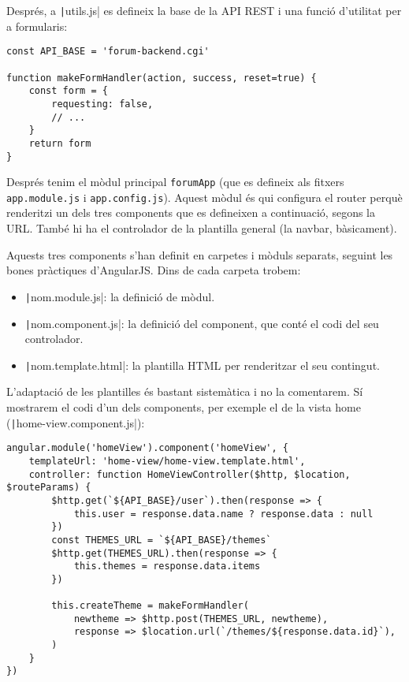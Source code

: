 \documentclass[catalan, a4paper]{scrartcl}
\begin{document}
Després, a \texttt|utils.js| es defineix la base de la API
REST i una funció d'utilitat per a formularis:

\begin{verbatim}
const API_BASE = 'forum-backend.cgi'

function makeFormHandler(action, success, reset=true) {
    const form = {
        requesting: false,
        // ...
    }
    return form
}
\end{verbatim}

Després tenim el mòdul principal \texttt{forumApp} (que es
defineix als fitxers \texttt{app.module.js} i \texttt{app.config.js}).
Aquest mòdul és qui configura el router perquè renderitzi un dels
tres components que es defineixen a continuació, segons la URL.
També hi ha el controlador de la plantilla general (la navbar,
bàsicament).

Aquests tres components s'han definit en carpetes i mòduls separats,
seguint les bones pràctiques d'AngularJS. Dins de cada carpeta trobem:

\begin{itemize}
  \item \texttt|nom.module.js|: la definició de mòdul.
  \item \texttt|nom.component.js|: la definició del component,
  que conté el codi del seu controlador.
  \item \texttt|nom.template.html|: la plantilla HTML per
  renderitzar el seu contingut.
\end{itemize}

L'adaptació de les plantilles és bastant sistemàtica i no la comentarem.
Sí mostrarem el codi d'un dels components, per exemple el de la vista
home (\texttt|home-view.component.js|):

\begin{verbatim}
angular.module('homeView').component('homeView', {
    templateUrl: 'home-view/home-view.template.html',
    controller: function HomeViewController($http, $location, $routeParams) {
        $http.get(`${API_BASE}/user`).then(response => {
            this.user = response.data.name ? response.data : null
        })
        const THEMES_URL = `${API_BASE}/themes`
        $http.get(THEMES_URL).then(response => {
            this.themes = response.data.items
        })
        
        this.createTheme = makeFormHandler(
            newtheme => $http.post(THEMES_URL, newtheme),
            response => $location.url(`/themes/${response.data.id}`),
        )
    }
})
\end{verbatim}
\end{document}
